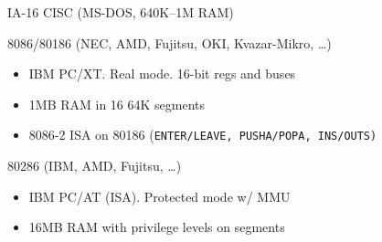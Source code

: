 \documentclass[xcolor={dvipsnames,table}]{beamer}
\begin{document}
\begin{frame}[t]{IA-16 CISC (MS-DOS, 640K--1M RAM)}
\begin{block}{8086/80186 (NEC, AMD, Fujitsu, OKI, Kvazar-Mikro, \ldots)}
\begin{itemize}
\item IBM PC/XT. Real mode. 16-bit regs and buses
\item 1MB RAM in 16 64K segments
\item 8086-2 ISA on 80186
{\footnotesize
(\tt{ENTER}/\tt{LEAVE}, \tt{PUSHA}/\tt{POPA}, \tt{INS}/\tt{OUTS})
}
\end{itemize}
\end{block}
\begin{block}{80286 (IBM, AMD, Fujitsu, \ldots)}
\begin{itemize}
\item IBM PC/AT (ISA). Protected mode w/ MMU
\item 16MB RAM with privilege levels on segments
\end{itemize}
\end{block}
\vfill
\begin{center}
\end{center}
\end{frame}
\end{document}
